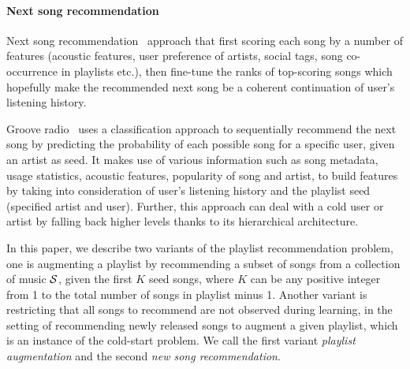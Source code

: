 \paragraph{Next song recommendation}
Next song recommendation~\cite{jannach2015beyond} approach that first scoring each song by a number of features
(\eg acoustic features, user preference of artists, social tags, song co-occurrence in playlists etc.),
then fine-tune the ranks of top-scoring songs which hopefully make the recommended next song be a coherent continuation of user's listening history.

Groove radio~\cite{ben2017groove} uses a classification approach to sequentially recommend 
the next song by predicting the probability of each possible song for a specific user, given an artist as seed.
It makes use of various information such as song metadata, usage statistics, acoustic features, popularity of song and artist,
to build features by taking into consideration of user's listening history and the playlist seed (\ie specified artist and user).
Further, this approach can deal with a cold user or artist by falling back higher levels thanks to its hierarchical architecture.


In this paper, we describe two variants of the playlist recommendation problem,
one is augmenting a playlist by recommending a subset of songs from a collection of music $\mathcal{S}$,
given the first $K$ seed songs, where $K$ can be any positive integer from 1 to the total number of songs in playlist minus 1.
Another variant is restricting that all songs to recommend are not observed during learning,
\ie in the setting of recommending newly released songs to augment a given playlist, which is an instance of the cold-start problem.
We call the first variant \emph{playlist augmentation} and the second \emph{new song recommendation}.
